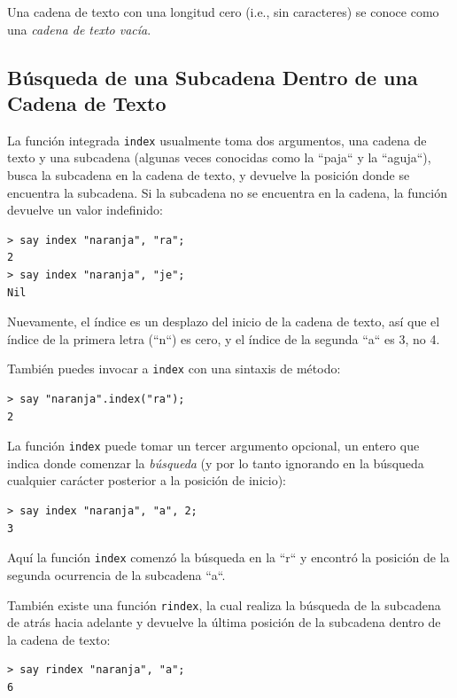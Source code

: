 Una cadena de texto con una longitud cero (i.e., sin caracteres) se
conoce como una \emph{cadena de texto vacía}.

\subsection{Búsqueda de una Subcadena Dentro de una Cadena de Texto}
\label{find}

La función integrada {\tt index} usualmente toma dos argumentos,
una cadena de texto y una subcadena (algunas veces conocidas como
la ``paja`` y la ``aguja``), busca la subcadena en la cadena de texto,
y devuelve la posición donde se encuentra la subcadena. Si la subcadena
no se encuentra en la cadena, la función devuelve un valor indefinido:

\begin{lstlisting}
> say index "naranja", "ra";
2
> say index "naranja", "je";
Nil
\end{lstlisting}
%

Nuevamente, el índice es un desplazo del inicio de la cadena 
de texto, así que el índice de la primera letra (``n``) es cero,
y el índice de la segunda ``a`` es 3, no 4.

También puedes invocar a {\tt index} con una sintaxis de método:
\begin{lstlisting}
> say "naranja".index("ra");
2
\end{lstlisting}
%

La función {\tt index} puede tomar un tercer argumento opcional,
un entero que indica donde comenzar la \emph{búsqueda} (y por lo
tanto ignorando en la búsqueda cualquier carácter posterior a
la posición de inicio):

\begin{lstlisting}
> say index "naranja", "a", 2;
3
\end{lstlisting}
%
Aquí la función {\tt index} comenzó la búsqueda en la ``r`` y encontró 
la posición de la segunda ocurrencia de la subcadena ``a``.
 

También existe una función {\tt rindex}, la cual realiza la búsqueda
de la subcadena de atrás hacia adelante y devuelve la última posición de 
la subcadena dentro de la cadena de texto:

\begin{lstlisting}
> say rindex "naranja", "a";
6
\end{lstlisting}
%

